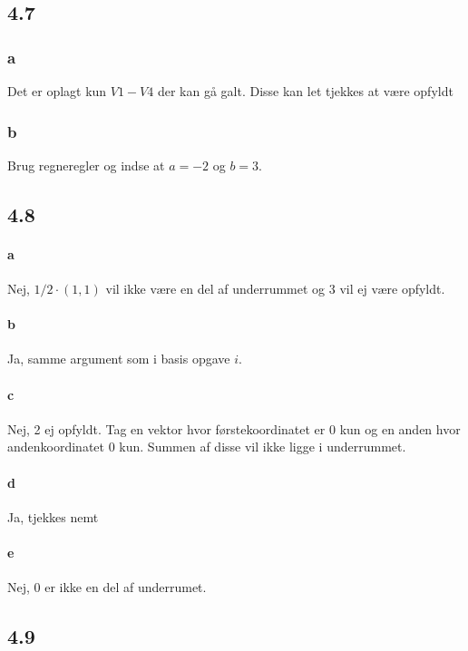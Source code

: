 		\subsection{4.7}

			\subsubsection{a}

				Det er oplagt kun $V1-V4$ der kan gå galt. Disse kan let tjekkes at være opfyldt

			\subsubsection{b}

				Brug regneregler og indse at $a=-2$ og $b=3$.

		\subsection{4.8}

			\paragraph{a} Nej, $1/2\cdot (1,1)$ vil ikke være en del af underrummet og 3 vil ej være opfyldt.

			\paragraph{b} Ja, samme argument som i basis opgave $i$.

			\paragraph{c} Nej, 2 ej opfyldt. Tag en vektor hvor førstekoordinatet er $0$ kun og en anden hvor andenkoordinatet $0$ kun. Summen af disse vil ikke ligge i underrummet.

			\paragraph{d} Ja, tjekkes nemt

			\paragraph{e} Nej, $0$ er ikke en del af underrumet.

		\subsection{4.9}

